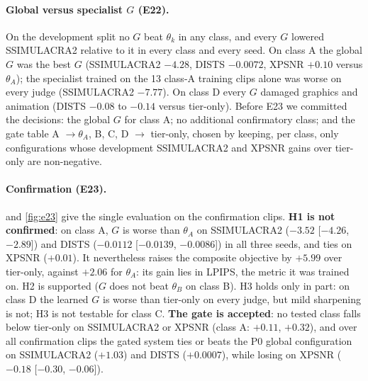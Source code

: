 \paragraph{Global versus specialist $G$ (E22).}
On the development split no $G$ beat $\theta_k$ in any class, and every $G$ lowered SSIMULACRA2
relative to it in every class and every seed. On class A the global $G$ was the best $G$
(SSIMULACRA2 $-4.28$, DISTS $-0.0072$, XPSNR $+0.10$ versus $\theta_A$); the specialist trained on
the 13 class-A training clips alone was worse on every judge (SSIMULACRA2 $-7.77$). On class D every
$G$ damaged graphics and animation (DISTS $-0.08$ to $-0.14$ versus tier-only). Before E23 we
committed the decisions: the global $G$ for class A; no additional confirmatory class; and the gate
table A $\to\theta_A$, B, C, D $\to$ tier-only, chosen by keeping, per class, only configurations
whose development SSIMULACRA2 and XPSNR gains over tier-only are non-negative.

\paragraph{Confirmation (E23).}
 and \cref{fig:e23} give the single evaluation on the confirmation clips.
\textbf{H1 is not confirmed}: on class A, $G$ is worse than $\theta_A$ on SSIMULACRA2 ($-3.52$
[$-4.26$, $-2.89$]) and DISTS ($-0.0112$ [$-0.0139$, $-0.0086$]) in all three seeds, and ties on XPSNR
($+0.01$). It nevertheless raises the composite objective by $+5.99$ over tier-only, against $+2.06$
for $\theta_A$: its gain lies in LPIPS, the metric it was trained on. H2 is supported ($G$ does not
beat $\theta_B$ on class B). H3 holds only in part: on class D the learned $G$ is worse than
tier-only on every judge, but mild sharpening is not; H3 is not testable for class C. \textbf{The
gate is accepted}: no tested class falls below tier-only on SSIMULACRA2 or XPSNR (class A:
$+0.11$, $+0.32$), and over all confirmation clips the gated system ties or beats the P0 global
configuration on SSIMULACRA2 ($+1.03$) and DISTS ($+0.0007$), while losing on XPSNR ($-0.18$
[$-0.30$, $-0.06$]).

